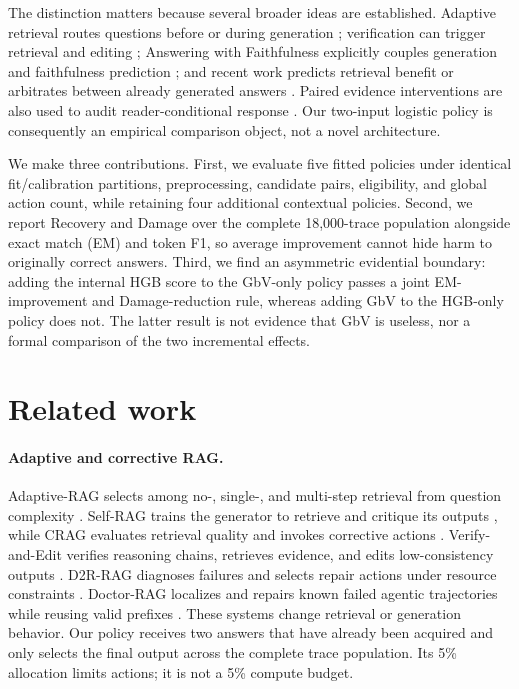 \documentclass[11pt]{article}
\begin{document}
The distinction matters because several broader ideas are established. Adaptive retrieval routes questions before or during generation \citep{jeong2024adaptive,asai2024selfrag,yan2024crag}; verification can trigger retrieval and editing \citep{zhao2023verifyedit}; Answering with Faithfulness explicitly couples generation and faithfulness prediction \citep{filice2025gbv}; and recent work predicts retrieval benefit or arbitrates between already generated answers \citep{dado2026benefit,xu2026trustmargin,kim2026search}. Paired evidence interventions are also used to audit reader-conditional response \citep{du2026pairid}. Our two-input logistic policy is consequently an empirical comparison object, not a novel architecture.

We make three contributions. First, we evaluate five fitted policies under identical fit/calibration partitions, preprocessing, candidate pairs, eligibility, and global action count, while retaining four additional contextual policies. Second, we report Recovery and Damage over the complete 18,000-trace population alongside exact match (EM) and token F1, so average improvement cannot hide harm to originally correct answers. Third, we find an asymmetric evidential boundary: adding the internal HGB score to the GbV-only policy passes a joint EM-improvement and Damage-reduction rule, whereas adding GbV to the HGB-only policy does not. The latter result is not evidence that GbV is useless, nor a formal comparison of the two incremental effects.

\section{Related work}
\paragraph{Adaptive and corrective RAG.}
Adaptive-RAG selects among no-, single-, and multi-step retrieval from question complexity \citep{jeong2024adaptive}. Self-RAG trains the generator to retrieve and critique its outputs \citep{asai2024selfrag}, while CRAG evaluates retrieval quality and invokes corrective actions \citep{yan2024crag}. Verify-and-Edit verifies reasoning chains, retrieves evidence, and edits low-consistency outputs \citep{zhao2023verifyedit}. D2R-RAG diagnoses failures and selects repair actions under resource constraints \citep{hashemifar2026d2r}. Doctor-RAG localizes and repairs known failed agentic trajectories while reusing valid prefixes \citep{jiao2026doctorrag}. These systems change retrieval or generation behavior. Our policy receives two answers that have already been acquired and only selects the final output across the complete trace population. Its 5\% allocation limits actions; it is not a 5\% compute budget.
\end{document}
